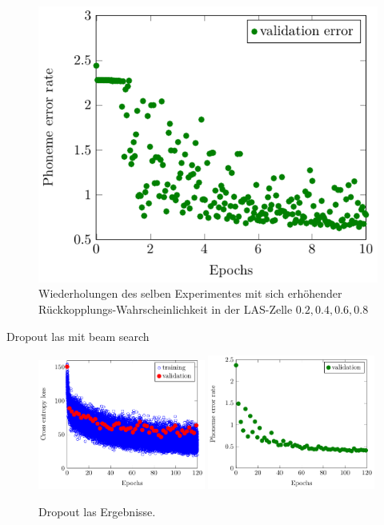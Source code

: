 \documentclass[10pt]{beamer}
\begin{document}
\begin{frame}
\begin{figure}
	\includegraphics[width=0.24\linewidth]{../tikz/LAS_no_reg_e10_p08_error}
	\caption{Wiederholungen des selben Experimentes mit sich erhöhender
	Rückkopplungs-Wahrscheinlichkeit in der LAS-Zelle $0.2, 0.4, 0.6, 0.8$}
	\label{fig:lasGreedy2468}
	\end{figure}
\end{frame}

\begin{frame}{Dropout las mit beam search}
	\begin{figure}
	\includegraphics[width=0.49\textwidth]{../tikz/LAS_dropout0805_in00_p06_e120_double_loss}
	\includegraphics[width=0.49\textwidth]{../tikz/LAS_dropout0805_in00_p06_e120_double_error}
	\caption{Dropout las Ergebnisse.}
	\end{figure}
\end{frame}
\end{document}
